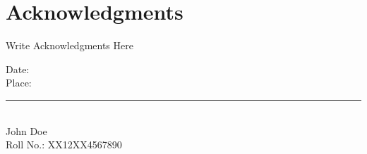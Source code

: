 
\chapter*{\centering Acknowledgments}

Write Acknowledgments Here

\vspace{4em}
\begin{minipage}[t]{0.35\textwidth}
    Date: \\
    Place:
\end{minipage}%
\hfill
\begin{minipage}[t]{0.4\textwidth}
\begin{flushright}
    \bfseries
    \rule{\textwidth}{1pt}\\
	John Doe\\
	Roll No.: XX12XX4567890
\end{flushright}
\end{minipage}

\newpage
\thispagestyle{empty}
\null\newpage
